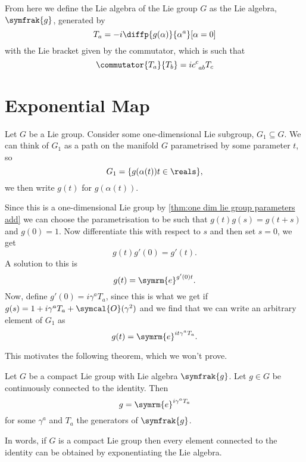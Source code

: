 \documentclass[fleqn]{NotesClass}
\newcommand{\subgroup}{\subseteq}
\newcommand{\e}{\symrm{e}}
\renewcommand{\lie}[1]{\symfrak{#1}}
\newcommand{\order}{\symcal{O}}
\begin{document}
    From here we define the Lie algebra of the Lie group \(G\) as the Lie algebra, \(\lie{g}\), generated by
    \begin{equation}
        T_a = -i\diffp{g(\alpha)}{\alpha^a}[\alpha = 0]
    \end{equation}
    with the Lie bracket given by the commutator, which is such that
    \begin{equation}
        \commutator{T_a}{T_b} = i\tensor{c}{^c_{ab}}T_c
    \end{equation}
    
    \section{Exponential Map}
    Let \(G\) be a Lie group.
    Consider some one-dimensional Lie subgroup, \(G_1 \subgroup G\).
    We can think of \(G_1\) as a path on the manifold \(G\) parametrised by some parameter \(t\), so
    \begin{equation}
        G_1 = \{g(\alpha(t)) t \in \reals\},
    \end{equation}
    we then write \(g(t)\) for \(g(\alpha(t))\).
    
    Since this is a one-dimensional Lie group by \cref{thm:one dim lie group parameters add} we can choose the parametrisation to be such that \(g(t)g(s) = g(t + s)\) and \(g(0) = 1\).
    Now differentiate this with respect to \(s\) and then set \(s = 0\), we get
    \begin{equation}
        g(t)g'(0) = g'(t).
    \end{equation}
    A solution to this is
    \begin{equation}
        g(t) = \e^{g'(0)t}.
    \end{equation}
    Now, define \(g'(0) = i\gamma^aT_a\), since this is what we get if \(g(s) = 1 + i\gamma^aT_a + \order(\gamma^2)\) and we find that we can write an arbitrary element of \(G_1\) as
    \begin{equation}
        g(t) = \e^{it\gamma^aT_a}.
    \end{equation}
    
    This motivates the following theorem, which we won't prove.
    \begin{thm}{}{}
        Let \(G\) be a compact Lie group with Lie algebra \(\lie{g}\).
        Let \(g \in G\) be continuously connected to the identity.
        Then
        \begin{equation}
            g = \e^{i\gamma^aT_a}
        \end{equation}
        for some \(\gamma^a\) and \(T_a\) the generators of \(\lie{g}\).
    \end{thm}
    In words, if \(G\) is a compact Lie group then every element connected to the identity can be obtained by exponentiating the Lie algebra.
    
\end{document}
